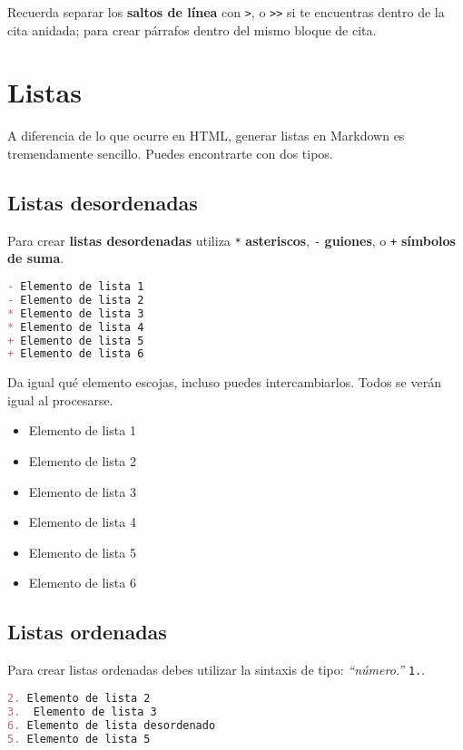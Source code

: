 Recuerda separar los \textbf{saltos de línea} con \lstinline{>}, o \lstinline{>>} si te encuentras dentro de la cita anidada; para crear párrafos dentro del mismo bloque de cita.

\section{Listas}

A diferencia de lo que ocurre en HTML, generar listas en Markdown es tremendamente sencillo. Puedes encontrarte con dos tipos.

\subsection{Listas desordenadas}

Para crear \textbf{listas desordenadas} utiliza \lstinline{*} \textbf{asteriscos}, \lstinline{-} \textbf{guiones}, o \lstinline{+} \textbf{símbolos de suma}.

\begin{lstlisting}[language= md]
- Elemento de lista 1
- Elemento de lista 2
* Elemento de lista 3
* Elemento de lista 4
+ Elemento de lista 5
+ Elemento de lista 6
\end{lstlisting}

Da igual qué elemento escojas, incluso puedes intercambiarlos. Todos se verán igual al procesarse.

\begin{itemize}
\item Elemento de lista 1
\item Elemento de lista 2
\item Elemento de lista 3
\item Elemento de lista 4
\item Elemento de lista 5
\item Elemento de lista 6
\end{itemize}

\subsection{Listas ordenadas}

Para crear listas ordenadas debes utilizar la sintaxis de tipo: \emph{“número.”} \lstinline{1.}.

\begin{lstlisting}[language= md]
2. Elemento de lista 2
3.  Elemento de lista 3
6. Elemento de lista desordenado
5. Elemento de lista 5
\end{lstlisting}

